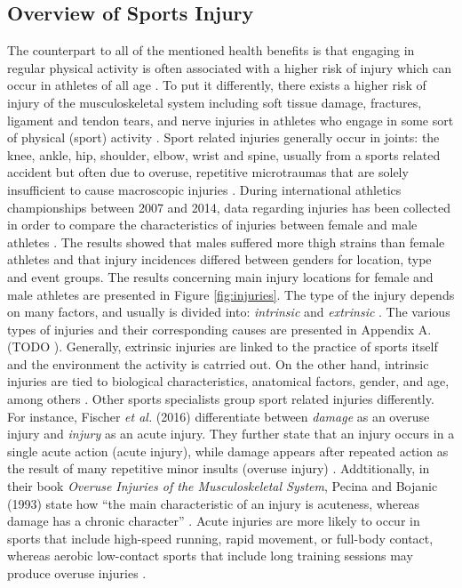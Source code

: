 \subsection{Overview of Sports Injury}\label{subsection:injury}
The counterpart to all of the mentioned health benefits is that engaging in regular physical activity is often associated with a higher risk of injury which can occur in athletes of all age \cite{van1997severity}. To put it differently, there exists a higher risk of injury of the musculoskeletal system including soft tissue
damage, fractures, ligament and tendon tears, and nerve injuries in athletes who engage in some sort of physical (sport) activity \cite{mayr2015prevention}. Sport related injuries generally occur in joints: the knee, ankle, hip, shoulder, elbow, wrist and spine, usually from a sports related accident but often due to overuse, repetitive microtraumas that are solely insufficient to cause macroscopic injuries
 \cite{mayr2015prevention}. During international athletics championships between 2007 and 2014, data regarding injuries has been collected in order to compare the characteristics of injuries between female and male athletes \cite{edouard2015sex}. The results showed that males suffered more thigh strains than female athletes and that injury incidences differed between genders for location, type and event groups. The results concerning main injury locations for female and male athletes are presented in Figure \ref{fig:injuries}. The type of the injury depends on many factors, and usually is divided into: \textit{intrinsic} and \textit{extrinsic} \cite{mayr2015prevention}. The various types of injuries and their corresponding causes are presented in Appendix A. (TODO %
). Generally, extrinsic injuries are linked to the practice of sports itself and the environment the activity is catrried out. On the other hand, intrinsic injuries are tied to biological characteristics, anatomical factors, gender, and age, among others \cite{mayr2015prevention}. Other sports specialists group sport related injuries differently. For instance, Fischer \textit{et al.} (2016) differentiate between \textit{damage} as an overuse injury and \textit{injury} as an acute injury. They further state that an injury occurs in a single acute action (acute injury), while damage appears after repeated action as the result of many repetitive minor insults (overuse injury) \cite{fischer2016causes}. Addtitionally, in their book \textit{Overuse Injuries of the Musculoskeletal System}, Pecina and Bojanic (1993) state how ``the main characteristic of an injury is acuteness, whereas damage has a chronic character'' \cite{pecina1993overuse}. Acute injuries are more likely to occur in sports that include high-speed running, rapid movement, or full-body contact, whereas aerobic low-contact sports that include long training sessions may produce overuse injuries  \cite{mayr2015prevention}.
